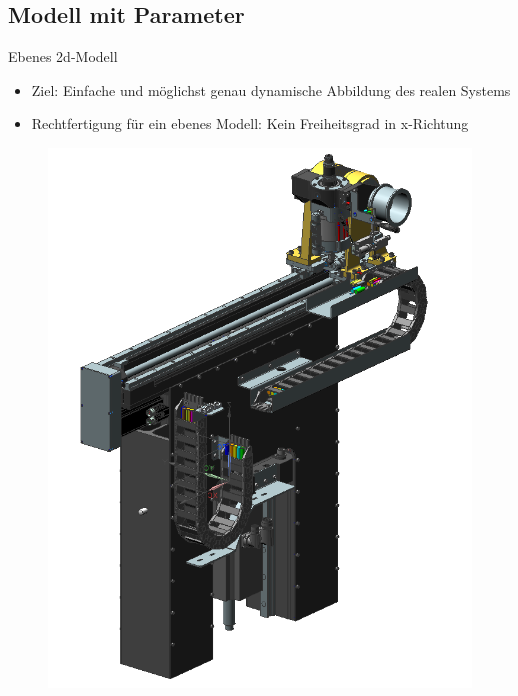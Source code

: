 \documentclass[10pt,xcolor=dvipsnames]{beamer}
\begin{document}
	\subsection{Modell mit Parameter}
		\begin{frame}{Ebenes 2d-Modell}
			\begin{itemize}
				\item Ziel: Einfache und möglichst genau dynamische Abbildung des realen Systems
				\item Rechtfertigung für ein ebenes Modell: Kein Freiheitsgrad in x-Richtung
			\end{itemize}
			\begin{minipage}{0.48\textwidth}
				\begin{figure}
					\includegraphics[width=0.9\linewidth]{./pics/aufbau_cad.png}
				\end{figure}
			\end{minipage}
			\hfill
			\begin{minipage}{0.48\textwidth}
				\vspace{-0.2cm}
				\begin{figure}

\end{figure}
\end{minipage}
\end{frame}
\end{document}
